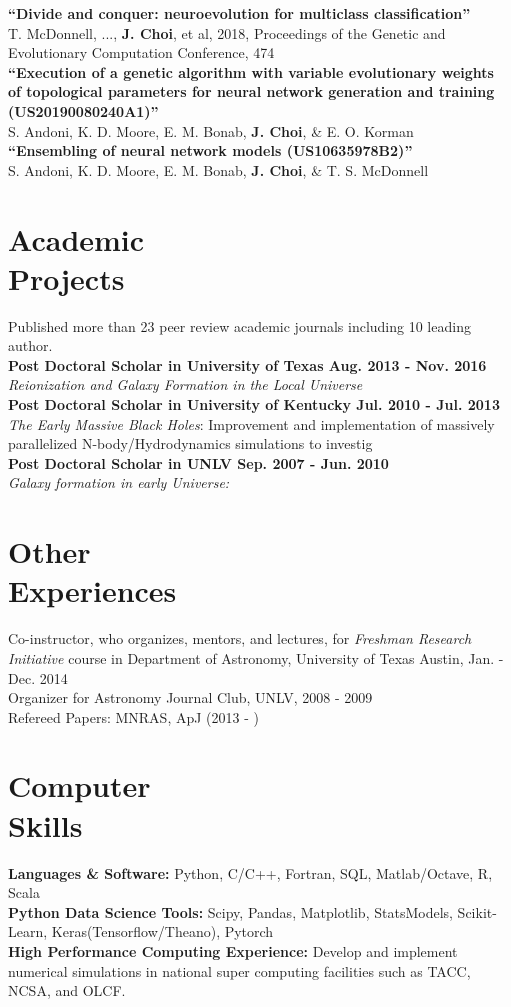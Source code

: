 \documentclass[margin,centered]{res}
\begin{document}
\begin{resume}
{\bf ``Divide and conquer: neuroevolution for multiclass classification''} \\ T. McDonnell, ..., \textbf{J. Choi}, et al, 2018, Proceedings of the Genetic and Evolutionary Computation Conference, 474 \\
{\bf ``Execution of a genetic algorithm with variable evolutionary weights of topological parameters for neural network generation and training (US20190080240A1)''} \\ S. Andoni, K. D. Moore, E. M. Bonab, \textbf{J. Choi}, \& E. O. Korman \\
{\bf ``Ensembling of neural network models (US10635978B2)''} \\ S. Andoni, K. D. Moore, E. M. Bonab, \textbf{J. Choi}, \& T. S. McDonnell

\section{Academic \\ Projects} Published more than 23 peer review academic journals including 10 leading author.\\
{\bf Post Doctoral Scholar in University of Texas Aug. 2013 - Nov. 2016} \\ 
{\it Reionization and Galaxy Formation in the Local Universe}\\
{\bf Post Doctoral Scholar in University of Kentucky Jul. 2010 - Jul. 2013 } \\
{\it The Early Massive Black Holes}: Improvement and implementation of massively parallelized N-body/Hydrodynamics simulations to investig\\
{\bf Post Doctoral Scholar in UNLV Sep. 2007 - Jun. 2010} \\
{\it Galaxy formation in early Universe:}

\section{Other \\ Experiences} 
Co-instructor, who organizes, mentors, and lectures,  for {\it Freshman Research Initiative} course in Department of Astronomy, University of Texas Austin, Jan. - Dec. 2014  \\
Organizer for Astronomy Journal Club, UNLV, 2008 - 2009 \\
Refereed Papers: MNRAS, ApJ (2013 - )

\section{Computer \\ Skills} 
{\bf Languages \& Software:} Python, C/C++, Fortran, SQL, Matlab/Octave, R, Scala\\
{\bf Python Data Science Tools:} Scipy, Pandas, Matplotlib, StatsModels, Scikit-Learn, Keras(Tensorflow/Theano), Pytorch \\
{\bf High Performance Computing Experience:} Develop and implement numerical simulations in national super computing facilities such as TACC, NCSA, and OLCF.


\end{resume}
\end{document}
